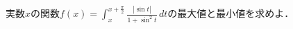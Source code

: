 \documentclass[../../main.tex]{subfiles}
\begin{document}
実数$x$の関数$\displaystyle f(x)=\int_x^{x+\frac{\pi}{2}}
\frac{|\sin t|}{1+\sin^2t} \, dt$の最大値と最小値を求めよ．
\end{document}
